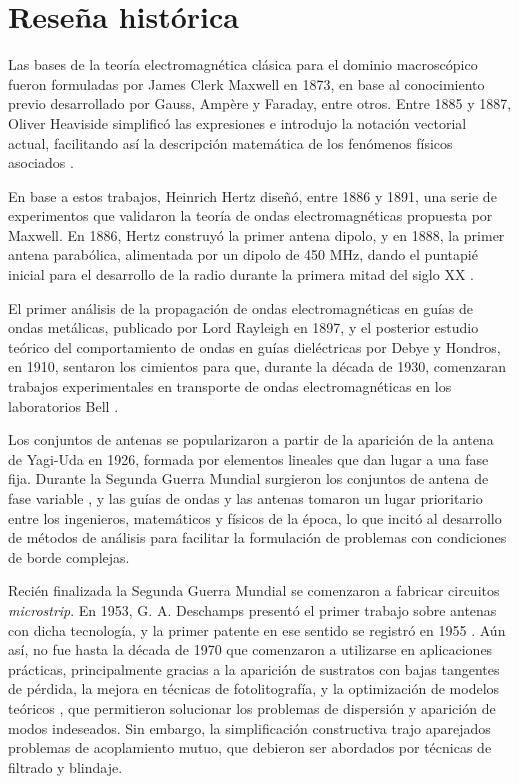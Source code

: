 
\section{Reseña histórica}
\label{sec_intro_resenia}

Las bases de la teoría electromagnética clásica para el dominio macroscópico fueron formuladas por James Clerk Maxwell en 1873, en base al conocimiento previo desarrollado por Gauss, Ampère y Faraday, entre otros. Entre 1885 y 1887, Oliver Heaviside simplificó las expresiones e introdujo la notación vectorial actual, facilitando así la descripción matemática de los fenómenos físicos asociados \cite{Pozar:MwEngineering}.

En base a estos trabajos, Heinrich Hertz diseñó, entre 1886 y 1891, una serie de experimentos que validaron la teoría de ondas electromagnéticas propuesta por Maxwell. En 1886, Hertz construyó la primer antena dipolo, y en 1888, la primer antena parabólica, alimentada por un dipolo de 450 MHz, dando el puntapié inicial para el desarrollo de la radio durante la primera mitad del siglo \textsc{XX} \cite{Collin:GuidedWaves}.

El primer análisis de la propagación de ondas electromagnéticas en guías de ondas metálicas, publicado por Lord Rayleigh en 1897, y el posterior estudio teórico del comportamiento de ondas en guías dieléctricas por Debye y Hondros, en 1910, sentaron los cimientos para que, durante la década de 1930, comenzaran trabajos experimentales en transporte de ondas electromagnéticas en los laboratorios Bell \cite{Collin:GuidedWaves}.

Los conjuntos de antenas se popularizaron a partir de la aparición de la antena de Yagi-Uda en 1926, formada por elementos lineales que dan lugar a una fase fija. Durante la Segunda Guerra Mundial surgieron los conjuntos de antena de fase variable \cite{Stutzman:AntennaTheory}, y las guías de ondas y las antenas tomaron un lugar prioritario entre los ingenieros, matemáticos y físicos de la época, lo que incitó al desarrollo de métodos de análisis para facilitar la formulación de problemas con condiciones de borde complejas.

Recién finalizada la Segunda Guerra Mundial se comenzaron a fabricar circuitos \textit{microstrip}. En 1953, G. A. Deschamps presentó el primer trabajo sobre antenas con dicha tecnología, y la primer patente en ese sentido se registró en 1955 \cite{Balanis:Handbook}. Aún así, no fue hasta la década de 1970 que comenzaron a utilizarse en aplicaciones prácticas, principalmente gracias a la aparición de sustratos con bajas tangentes de pérdida, la mejora en técnicas de fotolitografía, y la optimización de modelos teóricos \cite{Barthia:Handbook}, que permitieron solucionar los problemas de dispersión y aparición de modos indeseados. Sin embargo, la simplificación constructiva trajo aparejados problemas de acoplamiento mutuo, que debieron ser abordados por técnicas de filtrado y blindaje.


